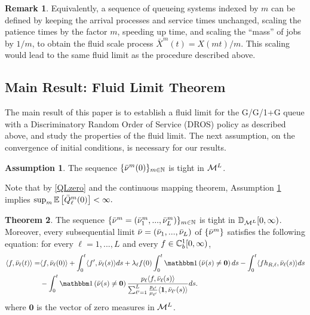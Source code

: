 \documentclass{article}
\theoremstyle{definition}
\newtheorem{assumption}{Assumption}[part]
\newtheorem{theorem}{Theorem}[section]
\newtheorem{remark}[theorem]{Remark}
\numberwithin{equation}{section}
\begin{document}
\begin{remark}
  Equivalently, a sequence of queueing systems indexed by $m$ can be defined by keeping the arrival processes and service times unchanged, scaling the patience times by the factor $m$, speeding up time, and scaling the ``mass'' of jobs by $1/m$, to obtain the fluid scale process $\bar X^m(t)=X(mt)/m$. This scaling would lead to the same fluid limit as the procedure described above.
\end{remark}

\subsection{Main Result: Fluid Limit Theorem}

The main result of this paper is to establish a fluid limit for the G/G/1+G queue with a Discriminatory Random Order of Service (DROS) policy as described above, and study the properties of the fluid limit. The next assumption, on the convergence of initial conditions, is necessary for our results.

\begin{assumption}\label{asm_initial}
The sequence $\{\bar{\nu}^m(0)\}_{m\in\mathbb{N}}$ is tight in $\mathcal{M}^L$.
\end{assumption}
Note that by \eqref{QLzero} and the continuous mapping theorem, Assumption \ref{asm_initial} implies $\sup_m \mathbb{E}\left[\bar {Q}^m_\ell(0)\right]<\infty.$




\begin{theorem}\label{thm_conv}
The sequence $\{\bar{\nu}^m=(\bar{\nu}_1^m,...,\bar{\nu}_L^m)\}_{m\in\mathbb{N}}$ is tight in $\mathbb{D}_{\mathcal{M}^L}[0,\infty)$. Moreover, every subsequential limit $\bar{\nu}=(\bar{\nu}_1,...,\bar{\nu}_L)$ of $\{\bar{\nu}^m\}$ satisfies the following equation: for every $\ell=1,...,L$ and every $f\in\mathbb{C}_b^{1}[0,\infty)$,
\begin{align}\label{fluid_eq}
  \langle f,\bnu_\ell(t)\rangle  = & \langle f,\bnu_\ell(0)\rangle + \int_0^t\langle f' ,\bnu_\ell(s)\rangle ds +\lambda_\ell f(0)\int_0^t\indic{\bar\nu(s)\neq\mathbf{0}}ds - \int_0^t\langle fh_{R,\ell},\bnu_\ell(s)\rangle ds \\
  &- \int_0^t\indic{\bar\nu(s)\neq \mathbf{0}}\frac{\weight_\ell\langle f,\bnu_\ell(s)\rangle}{\sum_{\ell'=1}^{L}\frac{\weight_{\ell'}}{\mu_{\ell'}}\langle\f1,\bnu_{\ell'}(s)\rangle} ds.\notag
\end{align}
where $\mathbf{0}$ is the vector of zero measures in $\mathcal{M}^L$.
\end{theorem}
\end{document}
